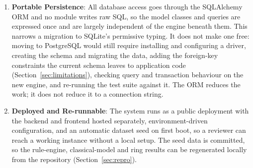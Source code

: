 \begin{enumerate}
  \item \textbf{Portable Persistence}: All database access goes through the SQLAlchemy ORM and no module writes raw SQL, so the model classes and queries are expressed once and are largely independent of the engine beneath them. This narrows a migration to SQLite's permissive typing. It does not make one free: moving to PostgreSQL would still require installing and configuring a driver, creating the schema and migrating the data, adding the foreign-key constraints the current schema leaves to application code (Section~\ref{sec:limitations}), checking query and transaction behaviour on the new engine, and re-running the test suite against it. The ORM reduces the work; it does not reduce it to a connection string.
  \item \textbf{Deployed and Re-runnable}: The system runs as a public deployment with the backend and frontend hosted separately, environment-driven configuration, and an automatic dataset seed on first boot, so a reviewer can reach a working instance without a local setup. The seed data is committed, so the rule-engine, classical-model and ring results can be regenerated locally from the repository (Section~\ref{sec:repro}).
\end{enumerate}

